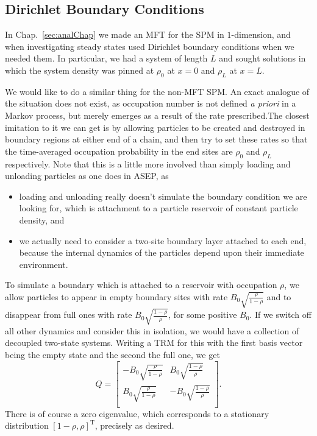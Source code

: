 \subsection{Dirichlet Boundary Conditions}
In Chap.~\ref{sec:analChap} we made an MFT for the SPM in $1$-dimension, and when 
investigating steady states used Dirichlet boundary conditions when we needed them.
In particular, we had a system of length $L$ and sought solutions in which the system
density was pinned at $\rho_0$ at $x=0$ and $\rho_L$ at $x=L$. 

We would like to do a similar thing for the non-MFT SPM. An exact analogue of the situation
does not exist, as occupation number is not defined \textit{a priori} in a Markov process, but merely emerges as a result of the rate prescribed.The closest imitation to it
we can get is by allowing particles to be created and destroyed in boundary regions at
either end of a chain, and then try to set these rates so that the time-averaged occupation probability in the end sites are $\rho_0$ and $\rho_L$ respectively. Note
that this is a little more involved than simply loading and unloading particles as
one does in ASEP, as
\begin{itemize}
 \item loading and unloading really doesn't simulate the boundary condition we are looking for,
 which is attachment to a particle reservoir of constant particle density, and
 \item we actually need to consider a two-site boundary layer attached to each end, because the internal dynamics of the particles depend upon their immediate environment.
\end{itemize}
To simulate a boundary which is attached to a reservoir with occupation $\rho$, we allow
particles to appear in empty boundary sites with rate $B_0 \sqrt{\frac{\rho}{1-\rho}}$
and to disappear from full ones with rate $B_0 \sqrt{\frac{1-\rho}{\rho}}$,
for some positive $B_0$. If we switch
off all other dynamics and consider this in isolation, we would have a collection of
decoupled two-state systems. Writing a TRM for this with the first basis vector being
the empty state and the second the full one, we get
\begin{equation}
 Q = 
 \begin{bmatrix}
  - B_0 \sqrt{\frac{\rho}{1-\rho}} & B_0 \sqrt{\frac{1-\rho}{\rho}} \\
  B_0 \sqrt{\frac{\rho}{1-\rho}} & -B_0 \sqrt{\frac{1-\rho}{\rho}} \\
 \end{bmatrix}.
\end{equation}
There is of course a zero eigenvalue, which corresponds to a stationary distribution
$ [1-\rho, \rho]^\mathrm{T} $, precisely as desired.

